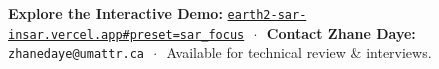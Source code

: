 \documentclass[10pt,letterpaper]{article}
\begin{document}
\vspace{-2pt}

\begin{tcolorbox}[colframe=umbrablack,colback=umbrablack,coltext=white,boxrule=0pt,top=4pt,bottom=4pt]
\centering\footnotesize
\textbf{Explore the Interactive Demo:} \href{https://earth2-sar-insar.vercel.app#preset=sar_focus&stage=v3}{\texttt{earth2-sar-insar.vercel.app\#preset=sar\_focus}} $\,\cdot\,$ 
\textbf{Contact Zhane Daye:} \texttt{zhanedaye@umattr.ca} $\,\cdot\,$ Available for technical review \& interviews.
\end{tcolorbox}
\end{document}
